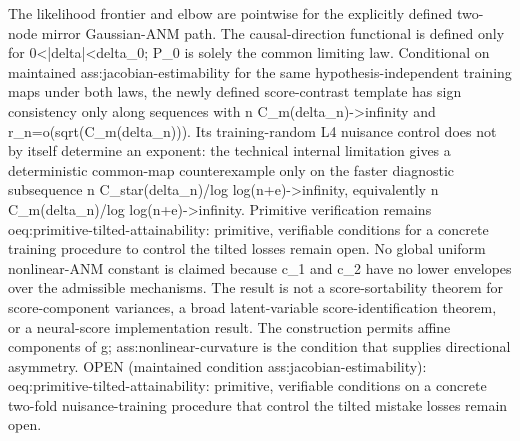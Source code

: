 \documentclass{article}
\begin{document}
The likelihood frontier and elbow are pointwise for the explicitly defined two-node mirror Gaussian-ANM path. The causal-direction functional is defined only for 0<|delta|<delta_0; P_0 is solely the common limiting law. Conditional on maintained ass:jacobian-estimability for the same hypothesis-independent training maps under both laws, the newly defined score-contrast template has sign consistency only along sequences with n C_m(delta_n)->infinity and r_n=o(sqrt(C_m(delta_n))). Its training-random L4 nuisance control does not by itself determine an exponent: the technical internal limitation gives a deterministic common-map counterexample only on the faster diagnostic subsequence n C_star(delta_n)/log log(n+e)->infinity, equivalently n C_m(delta_n)/log log(n+e)->infinity. Primitive verification remains oeq:primitive-tilted-attainability: primitive, verifiable conditions for a concrete training procedure to control the tilted losses remain open. No global uniform nonlinear-ANM constant is claimed because c_1 and c_2 have no lower envelopes over the admissible mechanisms. The result is not a score-sortability theorem for score-component variances, a broad latent-variable score-identification theorem, or a neural-score implementation result. The construction permits affine components of g; ass:nonlinear-curvature is the condition that supplies directional asymmetry. OPEN (maintained condition ass:jacobian-estimability): oeq:primitive-tilted-attainability: primitive, verifiable conditions on a concrete two-fold nuisance-training procedure that control the tilted mistake losses remain open.
\end{document}
